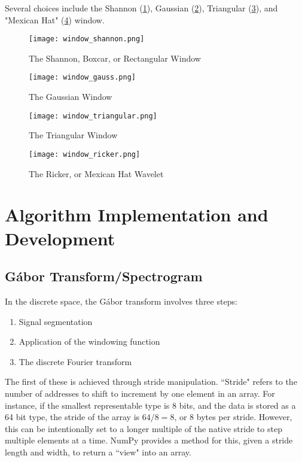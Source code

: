\documentclass[journal]{IEEEtran}
\begin{document}
Several choices include the Shannon (\ref{shannon}), Gaussian (\ref{gauss}), Triangular (\ref{triangular}), and "Mexican Hat" (\ref{ricker}) window.
\begin{figure}
	\centerline{\texttt{[image: window\_shannon.png]}}
	\caption{The Shannon, Boxcar, or Rectangular Window}
	\label{shannon}
\end{figure}
\begin{figure}
	\centerline{\texttt{[image: window\_gauss.png]}}
	\caption{The Gaussian Window}
	\label{gauss}
\end{figure}
\begin{figure}
	\centerline{\texttt{[image: window\_triangular.png]}}
	\caption{The Triangular Window}
	\label{triangular}
\end{figure}
\begin{figure}
	\centerline{\texttt{[image: window\_ricker.png]}}
	\caption{The Ricker, or Mexican Hat Wavelet}
	\label{ricker}
\end{figure}


\section{Algorithm Implementation and Development}

\subsection{G\'{a}bor Transform/Spectrogram}
In the discrete space, the G\'{a}bor transform involves three steps:
\begin{enumerate}
	\item Signal segmentation
	\item Application of the windowing function
	\item The discrete Fourier transform
\end{enumerate}

The first of these is achieved through stride manipulation. ``Stride" refers to the number of addresses to shift to increment by one element in an array. For instance, if the smallest representable type is 8 bits, and the
data is stored as a 64 bit type, the stride of the array is $64/8=8$, or 8 bytes per stride. However, this can be intentionally set to a longer multiple of the native stride to step multiple elements at a time. NumPy provides
a method for this, given a stride length and width, to return a ``view" into an array.
\end{document}
